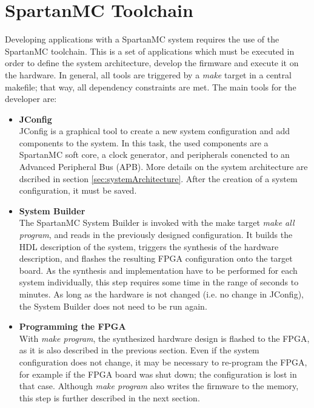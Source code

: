 \section{SpartanMC Toolchain}
\label{sec:spartanMCToolchain}

Developing applications with a SpartanMC system requires the use of the SpartanMC
toolchain. This is a set of applications which must be executed in order to define
the system architecture, develop the firmware and execute it on the hardware. In general,
all tools are triggered by a \emph{make} target in a central makefile; that way, all 
dependency constraints are met. The main tools for the developer are:

\begin{itemize}
\item \textbf{JConfig} \hfill \\
JConfig is a graphical tool to create a new system configuration and add components to
the system. In this task, the used components are a SpartanMC soft core, a clock 
generator, and peripherals conencted to an Advanced Peripheral Bus (APB). More details 
on the system architecture are dscribed in section \ref{sec:systemArchitecture}. 
After the creation of a system configuration, it must be saved. \\
\item \textbf{System Builder} \hfill \\
The SpartanMC System Builder is invoked with the make target \emph{make all program}, 
and reads in the previously designed configuration. It builds the HDL description
of the system, triggers the synthesis of the hardware description, and flashes the 
resulting FPGA configuration onto the target board. As the synthesis and implementation
have to be performed for each system individually, this step requires some time in the
range of seconds to minutes. As long as the hardware is not changed (i.e. no change in 
JConfig), the System Builder does not need to be run again. \\
\item \textbf{Programming the FPGA} \hfill \\
With \emph{make program}, the synthesized hardware design is flashed to the FPGA, as it
is also described in the previous section. Even if the system configuration does not
change, it may be necessary to re-program the FPGA, for example if the FPGA board was 
shut down; the configuration is lost in that case. Although \emph{make program} also writes the
firmware to the memory, this step is further described in the next section.\\

\end{itemize}
